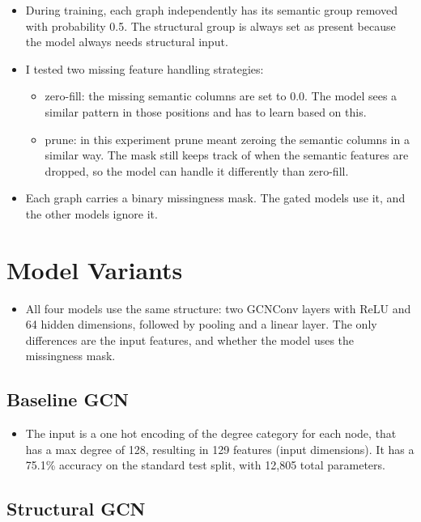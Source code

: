 \documentclass[12pt]{article}
\begin{document}
\begin{itemize}
    \item During training, each graph independently has its semantic group removed with probability 0.5. The structural group is always set as present because the model always needs structural input. 
    \item I tested two missing feature handling strategies:
        \begin{itemize}
            \item zero-fill: the missing semantic columns are set to 0.0. The model sees a similar pattern in those positions and has to learn based on this.
            \item prune: in this experiment prune meant zeroing the semantic columns in a similar way. The mask still keeps track of when the semantic features are dropped, so the model can handle it differently than zero-fill. 
        \end{itemize}
    \item Each graph carries a binary missingness mask. The gated models use it, and the other models ignore it.
\end{itemize}

\section{Model Variants}

\begin{itemize}
    \item All four models use the same structure: two GCNConv layers with ReLU and 64 hidden dimensions, followed by pooling and a linear layer. The only differences are the input features, and whether the model uses the missingness mask. 
\end{itemize}

\subsection{Baseline GCN}

\begin{itemize}
    \item The input is a one hot encoding of the degree category for each node, that has a max degree of 128, resulting in 129 features (input dimensions). It has a 75.1\% accuracy on the standard test split, with 12,805 total parameters.
\end{itemize}

\subsection{Structural GCN}
\end{document}
